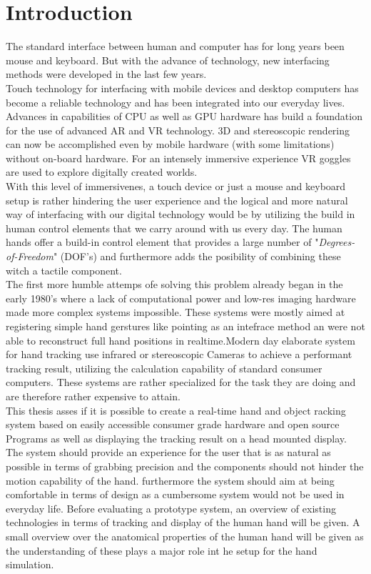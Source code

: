\chapter{Introduction}
The standard interface between human and computer has for long years been mouse and keyboard. But with the advance of technology, new interfacing methods were developed in the last few years.\\
Touch technology for interfacing with mobile devices and desktop computers has become a reliable technology and has been integrated into our everyday lives.
Advances in capabilities of CPU as well as GPU hardware has build a foundation for the use of advanced AR and VR technology. 3D and stereoscopic rendering can now be accomplished even by mobile hardware (with some limitations) without on-board hardware. For an intensely immersive experience VR goggles are used to explore digitally created worlds.\\
With this level of immersivenes, a touch device or just a mouse and keyboard setup is rather hindering the user experience and the logical and more natural way of interfacing with our digital technology would be by utilizing the build in human control elements that we carry around with us every day. The human hands offer a build-in control element that provides a large number of "\textit{Degrees-of-Freedom}" (DOF's) and furthermore adds the posibility of combining these witch a tactile component.\\The first more humble attemps ofe solving this problem already began in the early 1980's where a lack of computational power and low-res imaging hardware made more complex systems impossible. These systems were mostly aimed at registering simple hand gerstures like pointing as an intefrace method an were not able to reconstruct full hand positions in realtime\cite{Bolt.1980}.Modern day elaborate system for hand tracking use infrared or stereoscopic Cameras to achieve a performant tracking result, utilizing the calculation capability of standard consumer computers. These systems are rather specialized for the task they are doing and are therefore rather expensive to attain. \\
This thesis asses if it is possible to create a real-time hand and object racking system based on easily accessible consumer grade hardware and open source Programs as well as displaying the tracking result on a head mounted display. The system should provide an experience for the user that is as natural as possible in terms of grabbing precision and  the components should not hinder the motion capability of the hand. furthermore the system should aim at being comfortable in terms of design as a cumbersome system would not be used  in everyday life.
Before evaluating a prototype system, an overview of existing technologies in terms of tracking and display of the human hand will be given. A small overview over the anatomical properties of the human hand will be given as the understanding of these plays a major role int he setup for the hand simulation.

